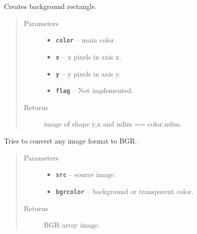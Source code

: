 \documentclass[letterpaper,10pt,english]{sphinxmanual}
\begin{document}
\begin{fulllineitems}
\label{RRtoolbox.lib:RRtoolbox.lib.plotter.background}
Creates background rectangle.
\begin{quote}\begin{description}
\item[{Parameters}] \leavevmode\begin{itemize}
\item {} 
\textbf{\texttt{color}} -- main color.

\item {} 
\textbf{\texttt{x}} -- x pixels in axis x.

\item {} 
\textbf{\texttt{y}} -- y pixels in axis y.

\item {} 
\textbf{\texttt{flag}} -- Not implemented.

\end{itemize}

\item[{Returns}] \leavevmode
image of shape y,x and ndim == color.ndim.

\end{description}\end{quote}

\end{fulllineitems}


\begin{fulllineitems}
\label{RRtoolbox.lib:RRtoolbox.lib.plotter.convert2bgr}
Tries to convert any image format to BGR.
\begin{quote}\begin{description}
\item[{Parameters}] \leavevmode\begin{itemize}
\item {} 
\textbf{\texttt{src}} -- source image.

\item {} 
\textbf{\texttt{bgrcolor}} -- background or transparent color.

\end{itemize}

\item[{Returns}] \leavevmode
BGR array image.

\end{description}\end{quote}

\end{fulllineitems}
\end{document}
